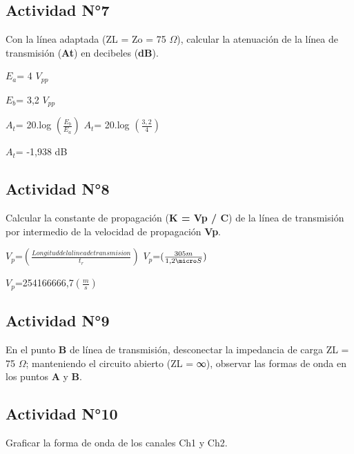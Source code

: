 \documentclass[12pt]{article}
\begin{document}
\subsection{Actividad N°7}
 Con la línea adaptada (ZL = Zo = 75 $\Omega$), calcular la atenuación de la línea de transmisión (\textbf{At}) en decibeles (\textbf{dB}).

 
 \begin{center}
\textbf{$E_a$}= 4 $V_{pp}$

\textbf{$E_b$}= 3,2 $V_{pp}$
 
 \vspace{0.5cm}
 
   $A_t$= 20.log  $(\frac{\textbf{$E_b$}}{\textbf{$E_a$}})$  \hspace{0.5cm}   \textbf{$A_t$}= 20.log  $(\frac{3,2}{4})$
 
  \vspace{0.5cm}
 
 \textbf{$A_t$}= -1,938 dB
 \end{center}
 
\subsection{Actividad N°8}
Calcular la constante de propagación (\textbf{K = Vp / C}) de la línea de transmisión por intermedio de la velocidad de propagación \textbf{Vp}.
 \begin{center}
     $V_p$=$(\frac{Longitud de la linea de transmision }{t_r})$       \hspace{0.5cm}    $V_p$=$(\frac{305m}{1,2 {\micro}S})$
      
      \vspace{0.5cm}
    
    $V_p$=254166666,7$(\frac{m}{s})$

 \end{center}

\subsection{Actividad N°9}
 En el punto \textbf{B} de línea de transmisión, desconectar la impedancia de carga ZL = 75 $\Omega$; manteniendo el circuito abierto  (ZL = ∞), observar las formas de onda en los puntos \textbf{A} y \textbf{B}.

\subsection{Actividad N°10}
 Graficar la forma de onda de los canales Ch1 y Ch2.
\end{document}
